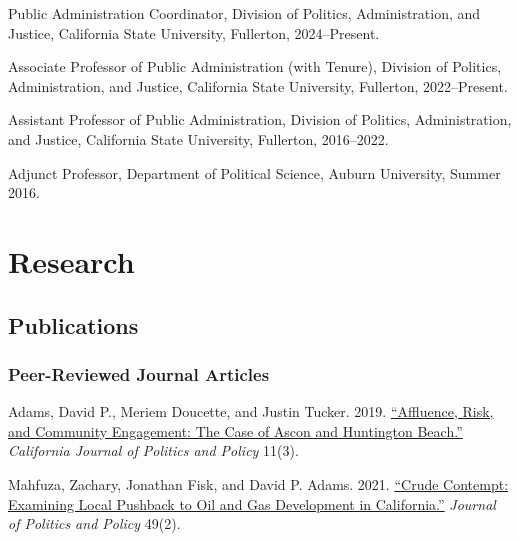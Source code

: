 \documentclass[12pt,letterpaper]{article}
\renewenvironment{itemize}{
  \begin{list}{}{
    \setlength{\leftmargin}{1.5em}
    \setlength{\itemsep}{0.25em}
    \setlength{\parskip}{0pt}
    \setlength{\parsep}{0.25em}
  }
}{
  \end{list}
}
\begin{document}
  \begin{itemize}\leftmargin=2pt\itemindent=-15pt\leftmargin=2pt\itemindent=-15pt
      \item Public Administration Coordinator, Division of Politics, Administration, and Justice, California State University, Fullerton, 2024--Present. \vspace{0.2cm}
      \item Associate Professor of Public Administration (with Tenure), Division of Politics, Administration, and Justice, California State University, Fullerton, 2022--Present. \vspace{0.2cm}
      \item Assistant Professor of Public Administration, Division of Politics, Administration, and Justice, California State University, Fullerton,  2016--2022.\vspace{0.2cm}
      \item Adjunct Professor, Department of Political Science, Auburn University, Summer 2016.
  \end{itemize}

\section*{Research}

\subsection*{Publications}

\subsubsection*{Peer-Reviewed Journal Articles}

\begin{itemize}\leftmargin=2pt\itemindent=-15pt\leftmargin=2pt\itemindent=-15pt

    \item Adams, David P., Meriem Doucette, and Justin Tucker. 2019. \href{https://escholarship.org/uc/item/2mz2n6qk}{``Affluence, Risk, and Community Engagement: The Case of Ascon and Huntington Beach.''} \emph{California Journal of Politics and Policy} 11(3).
    
    \item Mahfuza, Zachary, Jonathan Fisk, and David P. Adams. 2021. \href{https://doi.org/10.1111/polp.12401}{``Crude Contempt: Examining Local Pushback to Oil and Gas Development in California.''} \emph{Journal of Politics and Policy} 49(2).

  \end{itemize}
\end{document}
